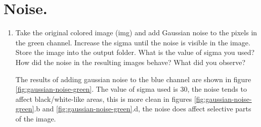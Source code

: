 \section{Noise.}
\begin{enumerate}[label=\emph{\alph*)}]
\item Take the original colored image (img) and add Gaussian noise to the pixels in the green channel. Increase the sigma until the noise is visible in the image. Store the image into the output folder. What is the value of sigma you used? How did the noise in the resulting images behave? What did you observe?

The results of adding gaussian noise to the blue channel are shown in figure \ref{fig:gaussian-noise-green}. The value of sigma used is 30, the noise tends to affect black/white-like areas, this is more clean in figures \ref{fig:gaussian-noise-green}.b and \ref{fig:gaussian-noise-green}.d, the noise does affect selective parts of the image.


\end{enumerate}
